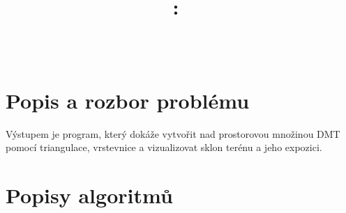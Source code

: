 \documentclass{article}
\title{
\vspace{2in}
\textmd{\textbf{\hmwkClass:\ \hmwkTitle}}\\
\normalsize\vspace{0.1in}\large{\hmwkDueDate}\\
\vspace{3in}
}
\author{\textbf{\hmwkAuthorName}}
\date{} %
\begin{document}
\maketitle



\newpage
\tableofcontents
\newpage




\section{Popis a rozbor problému} %
\indent Výstupem je program, který dokáže vytvořit nad prostorovou množinou DMT pomocí triangulace, vrstevnice a vizualizovat sklon terénu a jeho expozici. 

\section{Popisy algoritmů} %
\end{document}
